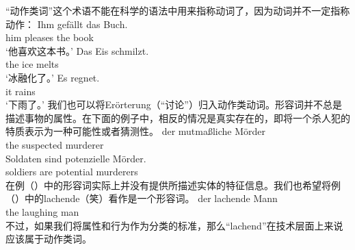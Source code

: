 “动作类词”这个术语不能在科学的语法中用来指称动词了，因为动词并不一定指称动作：
\eal
\ex
\gll Ihm gefällt das Buch.\\
	 him pleases the book\\
\glt `他喜欢这本书。'
\ex 
\gll Das Eis schmilzt.\\
	 the ice melts\\
\glt `冰融化了。'
\ex 
\gll Es regnet.\\
	 it rains\\
\glt `下雨了。'
\zl
我们也可以将Erörterung（“讨论”）归入动作类动词。形容词并不总是描述事物的属性。在下面的例子中，相反的情况是真实存在的，即将一个杀人犯的特质表示为一种可能性或者猜测性。
\eal
\ex 
\gll der mutmaßliche Mörder\\
     the suspected murderer\\
\ex 
\gll Soldaten sind potenzielle Mörder.\\
     soldiers are potential murderers\\
\zl
在例（）中的形容词实际上并没有提供所描述实体的特征信息。我们也希望将例（）中的lachende（笑）看作是一个形容词。
\ea
\gll der lachende Mann\\
	 the laughing man\\
\z
不过，如果我们将属性和行为作为分类的标准，那么“lachend”在技术层面上来说应该属于动作类词。


